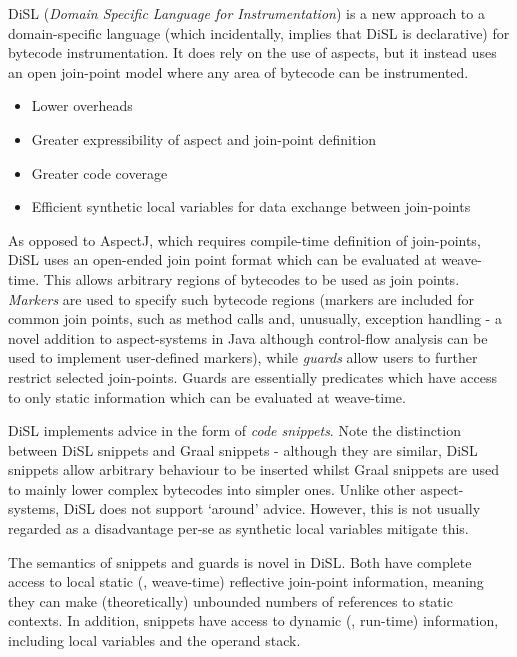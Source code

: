                 DiSL (\textit{Domain Specific Language for Instrumentation}) \citep{Marek2012} is a new approach to a domain-specific language (which incidentally, implies that DiSL is declarative) for bytecode instrumentation. It does rely on the use of aspects, but it instead uses an open join-point model where any area of bytecode can be instrumented.

                \begin{itemize}
                        \item Lower overheads
                        \item Greater expressibility of aspect and join-point definition
                        \item Greater code coverage
                        \item Efficient synthetic local variables for data exchange between join-points
                \end{itemize}

                As opposed to AspectJ, which requires compile-time definition of join-points, DiSL uses an open-ended join point format which can be evaluated at weave-time. This allows arbitrary regions of bytecodes to be used as join points. \textit{Markers} are used to specify such bytecode regions (markers are included for common join points, such as method calls and, unusually, exception handling - a novel addition to aspect-systems in Java although control-flow analysis can be used to implement user-defined markers), while \textit{guards} allow users to further restrict selected join-points. Guards are essentially predicates which have access to only static information which can be evaluated at weave-time.

                DiSL implements advice in the form of \textit{code snippets}. Note the distinction between DiSL snippets and Graal snippets - although they are similar, DiSL snippets allow arbitrary behaviour to be inserted whilst Graal snippets are used to mainly lower complex bytecodes into simpler ones. Unlike other aspect-systems, DiSL does not support `around' advice. However, this is not usually regarded as a disadvantage per-se as synthetic local variables mitigate this.

                The semantics of snippets and guards is novel in DiSL. Both have complete access to local static (\ie, weave-time) reflective join-point information, meaning they can make (theoretically) unbounded numbers of references to static contexts. In addition, snippets have access to dynamic (\ie, run-time) information, including local variables and the operand stack.

